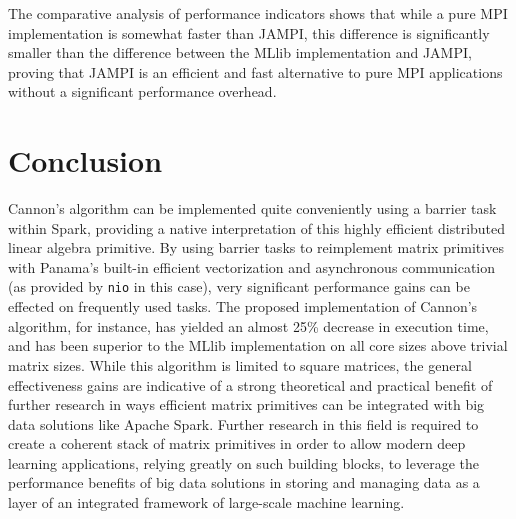 \documentclass[fleqn,10pt]{SelfArx} %
\begin{document}
The comparative analysis of performance indicators shows that while a pure MPI implementation is somewhat faster than JAMPI, this difference is significantly smaller than the difference between the MLlib implementation and JAMPI, proving that JAMPI is an efficient and fast alternative to pure MPI applications without a significant performance overhead.





\section{Conclusion} %
\label{sec:conclusion}

Cannon's algorithm can be implemented quite conveniently using a barrier task within Spark, providing a native interpretation of this highly efficient distributed linear algebra primitive. By using barrier tasks to reimplement matrix primitives with Panama's built-in efficient vectorization and asynchronous communication (as provided by \texttt{nio} in this case), very significant performance gains can be effected on frequently used tasks. The proposed implementation of Cannon's algorithm, for instance, has yielded an almost 25\% decrease in execution time, and has been superior to the MLlib implementation on all core sizes above trivial matrix sizes. While this algorithm is limited to square matrices, the general effectiveness gains are indicative of a strong theoretical and practical benefit of further research in ways efficient matrix primitives can be integrated with big data solutions like Apache Spark. Further research in this field is required to create a coherent stack of matrix primitives in order to allow modern deep learning applications, relying greatly on such building blocks, to leverage the performance benefits of big data solutions in storing and managing data as a layer of an integrated framework of large-scale machine learning.


\end{document}
